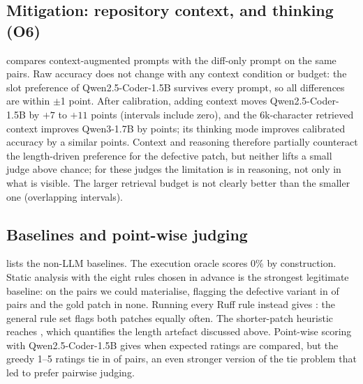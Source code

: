 

\subsection{Mitigation: repository context, and thinking (O6)}
\label{sec:res-context}

 compares context-augmented prompts with the diff-only
prompt on the same pairs.  Raw accuracy does not change with any context condition
or budget: the slot preference of Qwen2.5-Coder-1.5B survives every prompt, so
all differences are within $\pm$1 point.  After calibration, adding context
moves Qwen2.5-Coder-1.5B by $+7$ to $+11$ points (intervals include zero), and
the 6k-character retrieved context improves Qwen3-1.7B by \CtxQwenSCal{}
points; its thinking mode improves calibrated accuracy by a similar
\ThinkQwenSCal{} points.  Context and reasoning therefore partially counteract
the length-driven preference for the defective patch, but neither lifts a
small judge above chance; for these judges the limitation is in reasoning, not
only in what is visible.  The larger retrieval budget is not clearly better
than the smaller one (overlapping intervals).



\subsection{Baselines and point-wise judging}
\label{sec:res-baselines}

 lists the non-LLM baselines.  The execution oracle scores 0\% by construction.
Static analysis with the eight rules chosen in advance is the strongest
legitimate baseline: \StaticRelAcc{} on the \NStatic{} pairs we could
materialise, flagging the defective variant in \StaticRelFlagVar{} of pairs and
the gold patch in none.  Running every Ruff rule instead gives \StaticAllAcc{}:
the general rule set flags both patches equally often.  The shorter-patch
heuristic reaches \LengthHeurAcc{}, which quantifies the length artefact
discussed above.  Point-wise scoring with Qwen2.5-Coder-1.5B gives
\PointwiseAcc{} when expected ratings are compared, but the greedy 1--5
ratings tie in \PointwiseTies{} of pairs, an even stronger version of the
tie problem that led \CJB{} to prefer pairwise judging.


